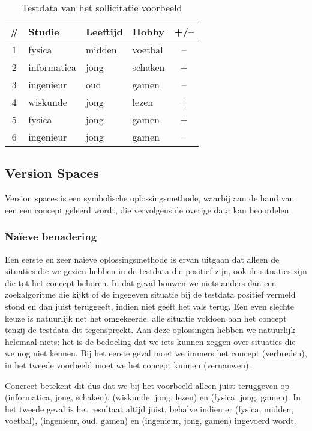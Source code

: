 \begin{table}[htb]
\centering
\begin{tabular}{c|l|l|l|c}
\#&Studie&Leeftijd&Hobby&+/--\\\hline
1&fysica&midden&voetbal&--\\
2&informatica&jong&schaken&+\\
3&ingenieur&oud&gamen&--\\
4&wiskunde&jong&lezen&+\\
5&fysica&jong&gamen&+\\
6&ingenieur&jong&gamen&--
\end{tabular}
\caption{Testdata van het sollicitatie voorbeeld}
\label{tbl:sollicitatieTestData}
\end{table}
\subsection{Version Spaces}
Version spaces is een symbolische oplossingsmethode, waarbij aan de hand van een  een concept geleerd wordt, die vervolgens de overige data kan beoordelen.
\subsubsection{Naïeve benadering}
\label{sss:versionSpacesNaif}
Een eerste en zeer naïeve oplossingsmethode is ervan uitgaan dat alleen de situaties die we gezien hebben in de testdata die positief zijn, ook de situaties zijn die tot het concept behoren. In dat geval bouwen we niets anders dan een zoekalgoritme die kijkt of de ingegeven situatie bij de testdata positief vermeld stond en dan juist teruggeeft, indien niet geeft het vals terug. Een even slechte keuze is natuurlijk net het omgekeerde: alle situatie voldoen aan het concept tenzij de testdata dit tegenspreekt. Aan deze oplossingen hebben we natuurlijk helemaal niets: het is de bedoeling dat we iets kunnen zeggen over situaties die we nog niet kennen. Bij het eerste geval moet we immers het concept  (verbreden), in het tweede voorbeeld moet we het concept kunnen  (vernauwen).
\begin{leftbar}
Concreet betekent dit dus dat we bij het voorbeeld alleen juist teruggeven op (informatica, jong, schaken), (wiskunde, jong, lezen) en (fysica, jong, gamen). In het tweede geval is het resultaat altijd juist, behalve indien er (fysica, midden, voetbal), (ingenieur, oud, gamen) en (ingenieur, jong, gamen) ingevoerd wordt. 
\end{leftbar}
